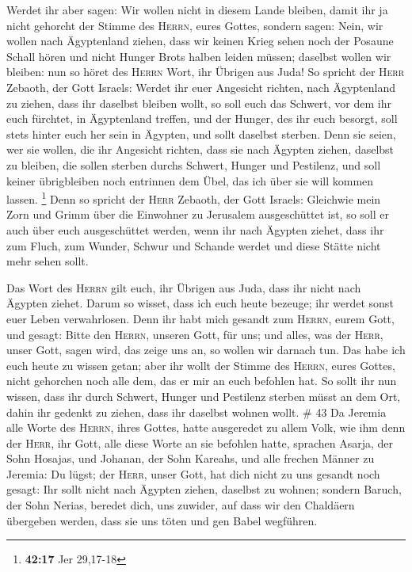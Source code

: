  Werdet ihr aber sagen: Wir wollen nicht in diesem Lande
bleiben, damit ihr ja nicht gehorcht der Stimme des \textsc{Herrn},
eures Gottes,  sondern sagen: Nein, wir wollen nach
Ägyptenland ziehen, dass wir keinen Krieg sehen noch der Posaune Schall
hören und nicht Hunger Brots halben leiden müssen; daselbst wollen wir
bleiben:  nun so höret des \textsc{Herrn} Wort, ihr
Übrigen aus Juda! So spricht der \textsc{Herr} Zebaoth, der Gott
Israels: Werdet ihr euer Angesicht richten, nach Ägyptenland zu ziehen,
dass ihr daselbst bleiben wollt,  so soll euch das
Schwert, vor dem ihr euch fürchtet, in Ägyptenland treffen, und der
Hunger, des ihr euch besorgt, soll stets hinter euch her sein in
Ägypten, und sollt daselbst sterben.  Denn sie seien, wer
sie wollen, die ihr Angesicht richten, dass sie nach Ägypten ziehen,
daselbst zu bleiben, die sollen sterben durchs Schwert, Hunger und
Pestilenz, und soll keiner übrigbleiben noch entrinnen dem Übel, das ich
über sie will kommen lassen. \footnote{\textbf{42:17} Jer 29,17-18}
 Denn so spricht der \textsc{Herr} Zebaoth, der Gott
Israels: Gleichwie mein Zorn und Grimm über die Einwohner zu Jerusalem
ausgeschüttet ist, so soll er auch über euch ausgeschüttet werden, wenn
ihr nach Ägypten ziehet, dass ihr zum Fluch, zum Wunder, Schwur und
Schande werdet und diese Stätte nicht mehr sehen sollt.

 Das Wort des \textsc{Herrn} gilt euch, ihr Übrigen aus
Juda, dass ihr nicht nach Ägypten ziehet. Darum so wisset, dass ich euch
heute bezeuge;  ihr werdet sonst euer Leben verwahrlosen.
Denn ihr habt mich gesandt zum \textsc{Herrn}, eurem Gott, und gesagt:
Bitte den \textsc{Herrn}, unseren Gott, für uns; und alles, was der
\textsc{Herr}, unser Gott, sagen wird, das zeige uns an, so wollen wir
darnach tun.  Das habe ich euch heute zu wissen getan;
aber ihr wollt der Stimme des \textsc{Herrn}, eures Gottes, nicht
gehorchen noch alle dem, das er mir an euch befohlen hat.
 So sollt ihr nun wissen, dass ihr durch Schwert, Hunger
und Pestilenz sterben müsst an dem Ort, dahin ihr gedenkt zu ziehen,
dass ihr daselbst wohnen wollt. \# 43  Da Jeremia alle
Worte des \textsc{Herrn}, ihres Gottes, hatte ausgeredet zu allem Volk,
wie ihm denn der \textsc{Herr}, ihr Gott, alle diese Worte an sie
befohlen hatte,  sprachen Asarja, der Sohn Hosajas, und
Johanan, der Sohn Kareahs, und alle frechen Männer zu Jeremia: Du lügst;
der \textsc{Herr}, unser Gott, hat dich nicht zu uns gesandt noch
gesagt: Ihr sollt nicht nach Ägypten ziehen, daselbst zu wohnen;
 sondern Baruch, der Sohn Nerias, beredet dich, uns
zuwider, auf dass wir den Chaldäern übergeben werden, dass sie uns töten
und gen Babel wegführen.

